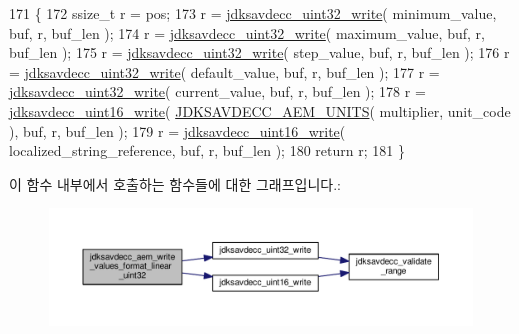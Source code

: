 \begin{DoxyCode}
171 \{
172     ssize\_t r = pos;
173     r = \hyperlink{group__endian_ga5c8d1aadb6e4ea355503a1945cfdbb92}{jdksavdecc\_uint32\_write}( minimum\_value, buf, r, buf\_len );
174     r = \hyperlink{group__endian_ga5c8d1aadb6e4ea355503a1945cfdbb92}{jdksavdecc\_uint32\_write}( maximum\_value, buf, r, buf\_len );
175     r = \hyperlink{group__endian_ga5c8d1aadb6e4ea355503a1945cfdbb92}{jdksavdecc\_uint32\_write}( step\_value, buf, r, buf\_len );
176     r = \hyperlink{group__endian_ga5c8d1aadb6e4ea355503a1945cfdbb92}{jdksavdecc\_uint32\_write}( default\_value, buf, r, buf\_len );
177     r = \hyperlink{group__endian_ga5c8d1aadb6e4ea355503a1945cfdbb92}{jdksavdecc\_uint32\_write}( current\_value, buf, r, buf\_len );
178     r = \hyperlink{group__endian_ga4c0851ce17bde5306fdb04bfb5b75af1}{jdksavdecc\_uint16\_write}( \hyperlink{group__aem__descriptor_gae5f7498f6048b4dda1aca923b0eae0f6}{JDKSAVDECC\_AEM\_UNITS}( 
      multiplier, unit\_code ), buf, r, buf\_len );
179     r = \hyperlink{group__endian_ga4c0851ce17bde5306fdb04bfb5b75af1}{jdksavdecc\_uint16\_write}( localized\_string\_reference, buf, r, buf\_len );
180     \textcolor{keywordflow}{return} r;
181 \}
\end{DoxyCode}


이 함수 내부에서 호출하는 함수들에 대한 그래프입니다.\+:
\nopagebreak
\begin{figure}[H]
\begin{center}
\leavevmode
\includegraphics[width=350pt]{group__aem__descriptor_ga2f182306ee3af74d5908dd789785b674_cgraph}
\end{center}
\end{figure}


